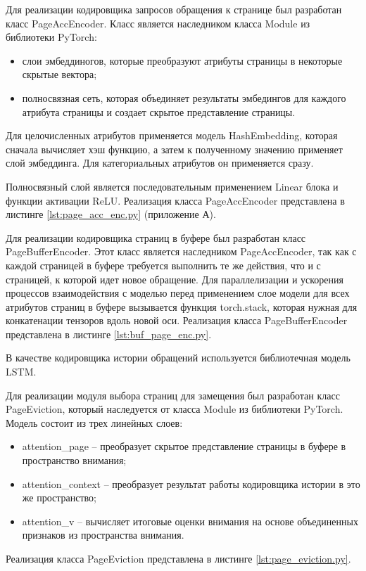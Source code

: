 Для реализации кодировщика запросов обращения к странице был разработан класс PageAccEncoder.
Класс является наследником класса Module из библиотеки PyTorch:
\begin{itemize}
	\item слои эмбеддиногов, которые преобразуют атрибуты страницы в некоторые скрытые вектора;
	\item полносвязная сеть, которая объединяет результаты эмбедингов для каждого атрибута страницы и создает скрытое представление страницы.
\end{itemize}

Для целочисленных атрибутов применяется модель HashEmbedding, которая сначала вычисляет хэш функцию, а затем к полученному значению применяет слой эмбеддинга.
Для категориальных атрибутов он применяется сразу.

Полносвязный слой является последовательным применением Linear блока и функции активации ReLU.
Реализация класса PageAccEncoder представлена в листинге \ref{lst:page_acc_enc.py} (приложение А).

Для реализации кодировщика страниц в буфере был разработан класс PageBufferEncoder.
Этот класс является наследником PageAccEncoder, так как с каждой страницей в буфере требуется выполнить те же действия, что и с страницей, к которой идет новое обращение.
Для параллелизации и ускорения процессов взаимодействия с моделью перед применением слое модели для всех атрибутов страниц в буфере вызывается функция torch.stack, которая нужная для конкатенации тензоров вдоль новой оси.
Реализация класса PageBufferEncoder представлена в листинге \ref{lst:buf_page_enc.py}.

В качестве кодировщика истории обращений используется библиотечная модель LSTM.

Для реализации модуля выбора страниц для замещения был разработан класс PageEviction, который наследуется от класса Module из библиотеки PyTorch.
Модель состоит из трех линейных слоев:
\begin{itemize}
	\item attention\_page -- преобразует скрытое представление страницы в буфере в пространство внимания;
	\item attention\_context -- преобразует результат работы кодировщика истории в это же пространство;
	\item attention\_v -- вычисляет итоговые оценки внимания на основе объединенных признаков из пространства внимания.
\end{itemize}
Реализация класса PageEviction представлена в листинге \ref{lst:page_eviction.py}.

